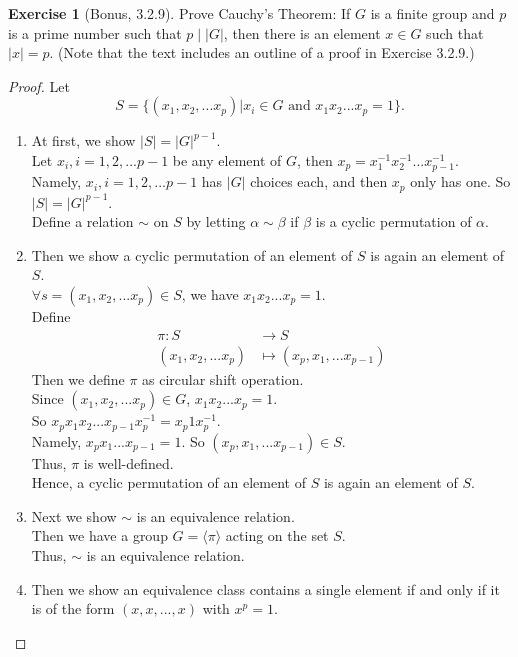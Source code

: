 \documentclass[14pt]{amsart}
\theoremstyle{plain}
\theoremstyle{definition}
\newtheorem{exer}[lem]{Exercise}
\begin{document}
\begin{exer}[Bonus, 3.2.9]
Prove Cauchy's Theorem: If $G$ is a finite group and $p$ is a prime number such that $p\mid |G|$, then there is an element $x\in G$ such that $|x|=p$.
(Note that the text includes an outline of a proof in Exercise 3.2.9.)
\end{exer}
\begin{proof}
	Let
	\[S=\{ (x_1,x_2,...x_p)| x_i \in G \text{ and } x_1x_2...x_p =1\}.\]
	\begin{enumerate}
	  \item
		At first, we show $|S|= |G|^{p-1}$.\\
 	    Let $x_i, i = 1,2,...p-1$ be any element of $G$, then $x_p = x_1^{-1}x_2^{-1}...x_{p-1}^{-1}$. \\
		Namely, $x_i,i = 1,2,...p-1$ has $|G|$ choices each, and then $x_p$ only has one. So $|S| = |G|^{p-1}$.	\\
		Define a relation $\sim $ on $S$ by letting $\alpha \sim \beta$ if $\beta$ is a cyclic permutation of $\alpha$.
	  \item
	  Then we show a cyclic permutation of an element of $S$ is again an element of $S$.\\
  	$\forall s = (x_1,x_2,...x_p) \in S$, we have $x_1x_2...x_p = 1$.\\
	Define 
	\begin{align*}
		\pi: S &\to S	\\
		(x_1,x_2,...x_p) &\mapsto (x_p,x_1,...x_{p-1})	
	\end{align*}
	Then we define $\pi$ as circular shift operation.\\
	Since $(x_1,x_2,...x_p) \in G$, $x_1x_2...x_p =1$.\\
	So $x_px_1x_2...x_{p-1}x_p^{-1} = x_p1 x_p^{-1}$.\\
	Namely, $x_px_1...x_{p-1} =1$. So $(x_p,x_1,...x_{p-1}) \in S$.\\
	Thus, $\pi$ is well-defined.\\
	Hence, a cyclic permutation of an element of $S$ is again an element of $S$.
	  \item
		Next we show $\sim $ is an equivalence relation.\\
 	   	Then we have a group $G = \langle \pi \rangle$ acting on the set $S$.\\
		Thus, $\sim $ is an equivalence relation.
	\item	
	  Then we show an equivalence class contains a single element if and only if it is of the form $(x,x,...,x)$ with $x^p = 1$.\\

\end{enumerate}
\end{proof}
\end{document}
